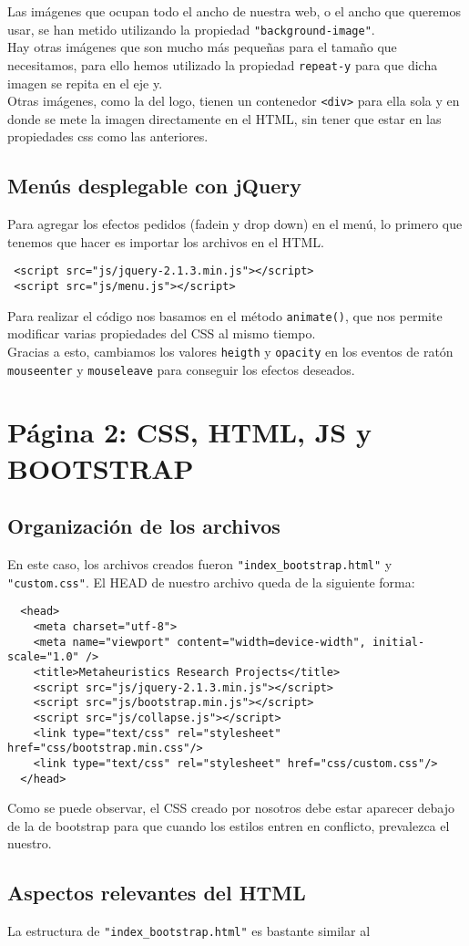 \documentclass[10pt,a4paper]{article}
\begin{document}
Las imágenes que ocupan todo el ancho de nuestra web, o el ancho que queremos usar, se han metido utilizando la propiedad \texttt{"background-image"}.\\


Hay otras imágenes que son mucho más pequeñas para el tamaño que necesitamos, para ello hemos utilizado la propiedad \texttt{repeat-y} para que dicha imagen se repita en el eje y.\\


Otras imágenes, como la del logo, tienen un contenedor \texttt{<div>} para ella sola y en donde se mete la imagen directamente en el HTML, sin tener que estar en las propiedades css como las anteriores. 



\subsection{Menús desplegable con jQuery}

Para agregar los efectos pedidos (fadein y drop down) en el menú, lo primero que tenemos que hacer es importar los archivos en el HTML.

\begin{verbatim}
 <script src="js/jquery-2.1.3.min.js"></script>
 <script src="js/menu.js"></script>
\end{verbatim}
 
Para realizar el código nos basamos en el método \texttt{animate()}, que nos permite modificar varias propiedades del CSS al mismo tiempo.\\

Gracias a esto, cambiamos los valores \texttt{heigth} y \texttt{opacity} en los eventos de ratón \texttt{mouseenter} y \texttt{mouseleave} para conseguir los efectos deseados.

\section{Página 2: CSS, HTML, JS y BOOTSTRAP}

\subsection{Organización de los archivos}
En este caso, los archivos creados fueron \texttt{"index\_bootstrap.html"} y \texttt{"custom.css"}.
El HEAD de nuestro archivo queda de la siguiente forma:
\begin{verbatim}
  <head>
    <meta charset="utf-8">
    <meta name="viewport" content="width=device-width", initial-scale="1.0" />
    <title>Metaheuristics Research Projects</title>
    <script src="js/jquery-2.1.3.min.js"></script>
    <script src="js/bootstrap.min.js"></script>
    <script src="js/collapse.js"></script>
    <link type="text/css" rel="stylesheet" href="css/bootstrap.min.css"/>
    <link type="text/css" rel="stylesheet" href="css/custom.css"/>
  </head>
\end{verbatim}

Como se puede observar, el CSS creado por nosotros debe estar aparecer debajo de la de bootstrap para que cuando los estilos entren en conflicto, prevalezca el nuestro.

\subsection{Aspectos relevantes del HTML}

La estructura de \texttt{"index\_bootstrap.html"} es bastante similar al 
\end{document}
